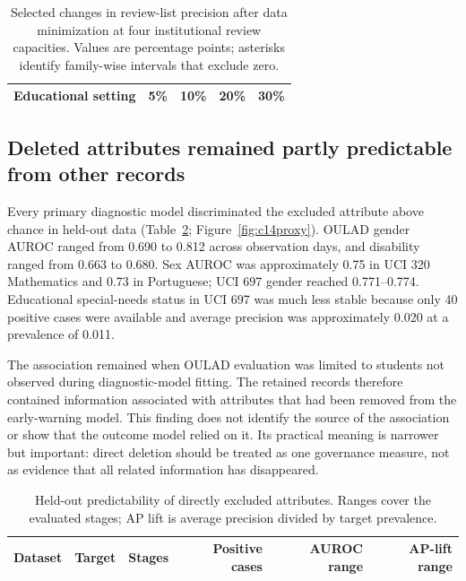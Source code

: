 \documentclass[education,article,submit,moreauthors]{Definitions/mdpi}
\begin{document}
\begin{table}[H]
\centering
\caption{Selected changes in review-list precision after data minimization at four institutional review capacities. Values are percentage points; asterisks identify family-wise intervals that exclude zero.}
\label{tab:c14budget}
\scriptsize
\setlength{\tabcolsep}{4pt}
\begin{tabular}{lrrrr}
\toprule
Educational setting & 5\% & 10\% & 20\% & 30\% \\
\midrule

\end{tabular}
\end{table}

\subsection{Deleted attributes remained partly predictable from other records}

Every primary diagnostic model discriminated the excluded attribute above chance in held-out data (Table~\ref{tab:c14proxy}; Figure~\ref{fig:c14proxy}). OULAD gender AUROC ranged from 0.690 to 0.812 across observation days, and disability ranged from 0.663 to 0.680. Sex AUROC was approximately 0.75 in UCI 320 Mathematics and 0.73 in Portuguese; UCI 697 gender reached 0.771--0.774. Educational special-needs status in UCI 697 was much less stable because only 40 positive cases were available and average precision was approximately 0.020 at a prevalence of 0.011.

The association remained when OULAD evaluation was limited to students not observed during diagnostic-model fitting. The retained records therefore contained information associated with attributes that had been removed from the early-warning model. This finding does not identify the source of the association or show that the outcome model relied on it. Its practical meaning is narrower but important: direct deletion should be treated as one governance measure, not as evidence that all related information has disappeared.

\begin{table}[H]
\centering
\caption{Held-out predictability of directly excluded attributes. Ranges cover the evaluated stages; AP lift is average precision divided by target prevalence.}
\label{tab:c14proxy}
\scriptsize
\begin{tabular}{llrrrr}
\toprule
Dataset & Target & Stages & Positive cases & AUROC range & AP-lift range \\
\midrule

\end{tabular}
\end{table}
\end{document}
